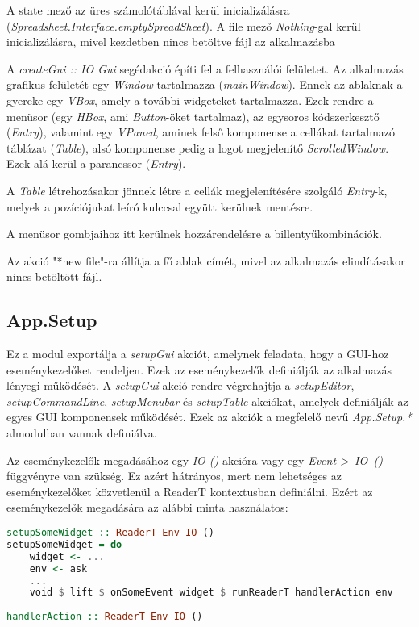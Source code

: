 A state mező az üres számolótáblával kerül inicializálásra (\textit{Spreadsheet.Interface.emptySpreadSheet}). A file mező \textit{Nothing}-gal kerül inicializálásra, mivel kezdetben nincs betöltve fájl az alkalmazásba

A \textit{createGui :: IO Gui} segédakció építi fel a felhasználói felületet. Az alkalmazás grafikus felületét egy \textit{Window} tartalmazza (\textit{mainWindow}). Ennek az ablaknak a gyereke egy \textit{VBox}, amely a további widgeteket tartalmazza.   Ezek rendre a menüsor (egy \textit{HBox}, ami \textit{Button}-öket tartalmaz),  az egysoros kódszerkesztő (\textit{Entry}), valamint egy \textit{VPaned}, aminek felső komponense a cellákat tartalmazó táblázat (\textit{Table}), alsó komponense pedig a logot megjelenítő \textit{ScrolledWindow}. Ezek alá kerül a parancssor (\textit{Entry}).

A \textit{Table} létrehozásakor jönnek létre a cellák megjelenítésére szolgáló \textit{Entry}-k, melyek a pozíciójukat leíró kulccsal együtt kerülnek mentésre.

A menüsor gombjaihoz itt kerülnek hozzárendelésre a billentyűkombinációk.

Az akció "*new file"-ra állítja a fő ablak címét, mivel az alkalmazás elindításakor nincs betöltött fájl.

\subsection{App.Setup}

Ez a modul exportálja a \textit{setupGui} akciót, amelynek feladata, hogy a GUI-hoz eseménykezelőket rendeljen. Ezek az eseménykezelők definiálják az alkalmazás lényegi működését. A \textit{setupGui} akció rendre végrehajtja a \textit{setupEditor}, \textit{setupCommandLine}, \textit{setupMenubar} és \textit{setupTable} akciókat, amelyek definiálják az egyes GUI komponensek működését. Ezek az akciók a megfelelő nevű \textit{App.Setup.*} almodulban vannak definiálva.

Az eseménykezelők megadásához egy \textit{IO ()} akcióra vagy egy \mbox{\textit{Event-> IO ()}} függvényre van szükség. Ez azért hátrányos, mert nem lehetséges az eseménykezelőket közvetlenül a ReaderT kontextusban definiálni. Ezért az eseménykezelők megadására az alábbi minta használatos:

\begin{lstlisting}[language={Haskell}]
setupSomeWidget :: ReaderT Env IO ()
setupSomeWidget = do
	widget <- ...
	env <- ask
	...
	void $ lift $ onSomeEvent widget $ runReaderT handlerAction env
	
handlerAction :: ReaderT Env IO ()
\end{lstlisting}

